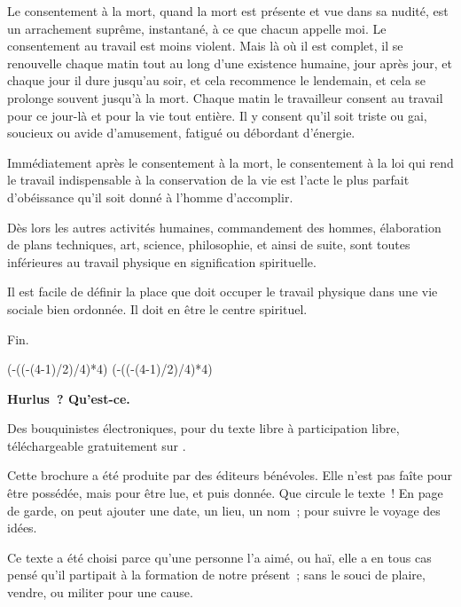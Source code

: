 \documentclass[french,twoside]{book} %
\def\truncdiv#1#2{((#1-(#2-1)/2)/#2)}
\def\moduloop#1#2{(#1-\truncdiv{#1}{#2}*#2)}
\def\modulo#1#2{\number\numexpr\moduloop{#1}{#2}\relax}
\begin{document}
Le consentement à la mort, quand la mort est présente et vue dans sa nudité, est un arrachement suprême, instantané, à ce que chacun appelle moi. Le consentement au travail est moins violent. Mais là où il est complet, il se renouvelle chaque matin tout au long d'une existence humaine, jour après jour, et chaque jour il dure jusqu'au soir, et cela recommence le lendemain, et cela se prolonge souvent jusqu'à la mort. Chaque matin le travailleur consent au travail pour ce jour-là et pour la vie tout entière. Il y consent qu'il soit triste ou gai, soucieux ou avide d'amusement, fatigué ou débordant d'énergie.\par
Immédiatement après le consentement à la mort, le consentement à la loi qui rend le travail indispensable à la conservation de la vie est l'acte le plus parfait d'obéissance qu'il soit donné à l'homme d'accomplir.\par
Dès lors les autres activités humaines, commandement des hommes, élaboration de plans techniques, art, science, philosophie, et ainsi de suite, sont toutes inférieures au travail physique en signification spirituelle.\par
Il est facile de définir la place que doit occuper le travail physique dans une vie sociale bien ordonnée. Il doit en être le centre spirituel.\par
Fin.
 


\ifbooklet
  \pagestyle{empty}
  \clearpage
  \ifnum\modulo{\value{page}}{4}=0 \hbox{}\newpage\hbox{}\newpage\fi
  \ifnum\modulo{\value{page}}{4}=1 \hbox{}\newpage\hbox{}\newpage\fi


  \hbox{}\newpage
  \ifodd\value{page}\hbox{}\newpage\fi
  {\centering\color{rubric}\bfseries\noindent\large
    Hurlus ? Qu’est-ce.\par
    \bigskip
  }
  \noindent Des bouquinistes électroniques, pour du texte libre à participation libre,
  téléchargeable gratuitement sur \href{https://hurlus.fr}{}.\par
  \bigskip
  \noindent Cette brochure a été produite par des éditeurs bénévoles.
  Elle n’est pas faîte pour être possédée, mais pour être lue, et puis donnée.
  Que circule le texte !
  En page de garde, on peut ajouter une date, un lieu, un nom ; pour suivre le voyage des idées.
  \par

  Ce texte a été choisi parce qu’une personne l’a aimé,
  ou haï, elle a en tous cas pensé qu’il partipait à la formation de notre présent ;
  sans le souci de plaire, vendre, ou militer pour une cause.
  \par
\end{document}
